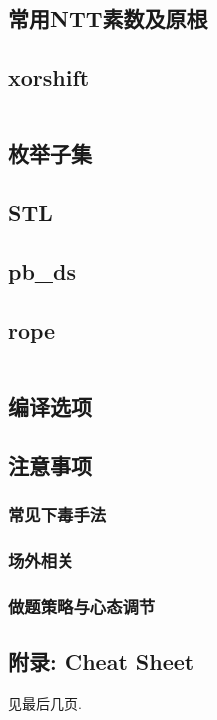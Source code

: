 \documentclass[a4paper]{article}
\begin{document}
\begin{multicols}{2}
				\subsection{常用NTT素数及原根}
					

				\subsection{xorshift}
					\inputminted{cpp}{../src/misc/xorshift.cpp}
				
				\subsection{枚举子集}
					
					
				\subsection{STL}
					

				\subsection{pb\_ds}
					

				\subsection{rope}
					\inputminted{cpp}{../src/misc/rope.cpp}
				
				\subsection{编译选项}
					
					
				\subsection{注意事项}

					\subsubsection{常见下毒手法}
						

					\subsubsection{场外相关}
						

					\subsubsection{做题策略与心态调节}
						
				
				\subsection{附录: Cheat Sheet}
					见最后几页.

	\end{multicols}

	
\end{document}
